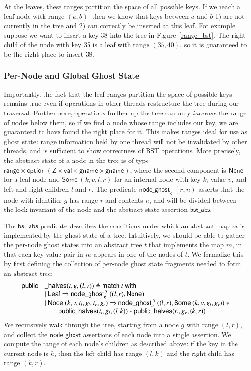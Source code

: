 \documentclass[runningheads]{llncs}
\newcommand{\treerep}{\ensuremath{\mathsf{bst\_abs}}}
\newcommand{\nodeghost}[2]{\ensuremath{\mathsf{node\_ghost}_{#1}\ (#2)}}
\newcommand{\publichalf}[2]{\ensuremath{\mathsf{node\_ghost}^{.5}_{#1}\ (#2)}}
\begin{document}
At the leaves, these ranges partition the space of all possible keys. If we reach a leaf node with range $(a, b)$, then we know that keys between $a$ and $b$ 1) are not currently in the tree and 2) can correctly be inserted at this leaf.  For example, suppose we want to insert a key $38$ into the tree in Figure~\ref{range_bst}. The right child of the node with key 35 is a leaf with range $(35, 40)$, so it is guaranteed to be the right place to insert 38.

\subsubsection{Per-Node and Global Ghost State}
Importantly, the fact that the leaf ranges partition the space of possible keys remains true even if operations in other threads restructure the tree during our traversal. Furthermore, operations further up the tree can only \emph{increase} the range of nodes below them, so if we find a node whose range includes our key, we are guaranteed to have found the right place for it. This makes ranges ideal for use as ghost state: range information held by one thread will not be invalidated by other threads, and is sufficient to show correctness of BST operations. More precisely, the abstract state of a node in the tree is of type $\mathsf{range} \times \mathsf{option\ (Z \times val \times gname \times gname)}$, where the second component is $\mathsf{None}$ for a leaf node and $\mathsf{Some}\ (k, v, l, r)$ for an internal node with key $k$, value $v$, and left and right children $l$ and $r$. The predicate $\nodeghost{g}{r, n}$ asserts that the node with identifier $g$ has range $r$ and contents $n$, and will be divided between the lock invariant of the node and the abstract state assertion $\treerep$.

The $\treerep$ predicate describes the conditions under which an abstract map $m$ is implemented by the ghost state of a tree. Intuitively, we should be able to gather the per-node ghost states into an abstract tree $t$ that implements the map $m$, in that each key-value pair in $m$ appears in one of the nodes of $t$. We formalize this by first defining the collection of per-node ghost state fragments needed to form an abstract tree:
$$\begin{array}{r l}
\mathsf{public}&\mathsf{\_halves}(t, g, (l, r)) \triangleq \mathsf{match}\ t\ \mathsf{with}\\
& |\ \mathsf{Leaf} \Rightarrow \publichalf{g}{(l, r), \mathsf{None}}\\
& |\ \mathsf{Node}\ (k, v, t_l, g_l, t_r, g_r) \Rightarrow \publichalf{g}{(l, r), \mathsf{Some}\ (k, v, g_l, g_r)}\ * \\&\qquad\mathsf{public\_halves}(t_l, g_l, (l, k)) * \mathsf{public\_halves}(t_r, g_r, (k, r))
\end{array}$$
We recursively walk through the tree, starting from a node $g$ with range $(l, r)$, and collect the $\mathsf{node\_ghost}$ assertions of each node into a single assertion. We compute the range of each node's children as described above: if the key in the current node is $k$, then the left child has range $(l, k)$ and the right child has range $(k, r)$.
\end{document}
